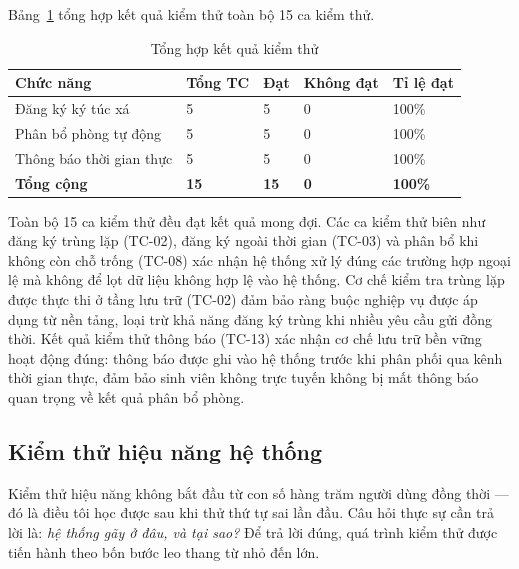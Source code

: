\documentclass[../DoAn.tex]{subfiles}
\begin{document}
Bảng~\ref{tab:test_summary} tổng hợp kết quả kiểm thử toàn bộ 15 ca kiểm thử.

\begin{table}[H]
\centering
\caption{Tổng hợp kết quả kiểm thử}
\label{tab:test_summary}
\small
\begin{tabular}{|p{5.4cm}|p{2.0cm}|p{1.8cm}|p{2.2cm}|p{1.8cm}|}
\hline
\textbf{Chức năng} & \textbf{Tổng TC} & \textbf{Đạt} & \textbf{Không đạt} & \textbf{Tỉ lệ đạt} \\
\hline
Đăng ký ký túc xá & 5 & 5 & 0 & 100\% \\
\hline
Phân bổ phòng tự động & 5 & 5 & 0 & 100\% \\
\hline
Thông báo thời gian thực & 5 & 5 & 0 & 100\% \\
\hline
\textbf{Tổng cộng} & \textbf{15} & \textbf{15} & \textbf{0} & \textbf{100\%} \\
\hline
\end{tabular}
\end{table}

Toàn bộ 15 ca kiểm thử đều đạt kết quả mong đợi. Các ca kiểm thử biên như đăng
ký trùng lặp (TC-02), đăng ký ngoài thời gian (TC-03) và phân bổ khi không còn
chỗ trống (TC-08) xác nhận hệ thống xử lý đúng các trường hợp ngoại lệ mà
không để lọt dữ liệu không hợp lệ vào hệ thống. Cơ chế kiểm tra trùng lặp được
thực thi ở tầng lưu trữ (TC-02) đảm bảo ràng buộc nghiệp vụ được áp dụng từ
nền tảng, loại trừ khả năng đăng ký trùng khi nhiều yêu cầu gửi đồng thời. Kết
quả kiểm thử thông báo (TC-13) xác nhận cơ chế lưu trữ bền vững hoạt động đúng:
thông báo được ghi vào hệ thống trước khi phân phối qua kênh thời gian thực, đảm
bảo sinh viên không trực tuyến không bị mất thông báo quan trọng về kết quả phân
bổ phòng.

\subsection{Kiểm thử hiệu năng hệ thống}
\label{subsec:performance-test}

Kiểm thử hiệu năng không bắt đầu từ con số hàng trăm người dùng đồng thời ---
đó là điều tôi học được sau khi thử thứ tự sai lần đầu. Câu hỏi thực sự cần trả
lời là: \textit{hệ thống gãy ở đâu, và tại sao?} Để trả lời đúng, quá trình kiểm
thử được tiến hành theo bốn bước leo thang từ nhỏ đến lớn.
\end{document}
